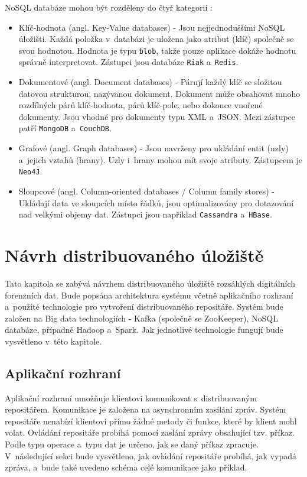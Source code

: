 \vspace{0.5cm}
\noindent NoSQL databáze mohou být rozděleny do čtyř kategorií \cite{noSqlOverview}:
\begin{itemize}
    \item Klíč-hodnota (angl. Key-Value databases) - Jsou nejjednoduššími NoSQL úložišti. Každá položka v~databázi je uložena jako atribut (klíč) společně se svou hodnotou. Hodnota je typu \texttt{blob}, takže pouze aplikace dokáže hodnotu správně interpretovat. Zástupci jsou databáze \texttt{Riak} a~\texttt{Redis}.
    
    \item Dokumentové (angl. Document databases) - Párují každý klíč se složitou datovou strukturou, nazývanou dokument. Dokument může obsahovat mnoho rozdílných párů klíč-hodnota, párů klíč-pole, nebo dokonce vnořené dokumenty. Jsou vhodné pro dokumenty typu XML a~JSON. Mezi zástupce patří \texttt{MongoDB} a~\texttt{CouchDB}.
    
    \item Grafové (angl. Graph databases) - Jsou navrženy pro ukládání entit (uzly) a~jejich vztahů (hrany). Uzly i~hrany mohou mít svoje atributy. Zástupcem je \texttt{Neo4J}.
    
    \item Sloupcové (angl. Column-oriented databases / Column family stores) - Ukládají data ve sloupcích místo řádků, jsou optimalizovány pro dotazování nad velkými objemy dat. Zástupci jsou například \texttt{Cassandra} a~\texttt{HBase}.
\end{itemize}

\chapter{Návrh distribuovaného úložiště} \label{distrRepDesignChapter}
Tato kapitola se zabývá návrhem distribuovaného úložiště rozsáhlých digitálních forenzních dat. Bude popsána architektura systému včetně aplikačního rozhraní a~použité technologie pro vytvoření distribuovaného repositáře.
Systém bude založen na Big data technologiích - Kafka (společně se ZooKeeper), NoSQL databáze, případně Hadoop a~Spark. Jak jednotlivé technologie fungují bude vysvětleno v~této kapitole.

\section{Aplikační rozhraní}
Aplikační rozhraní umožňuje klientovi komunikovat s~distribuovaným repositářem. Komunikace je založena na asynchronním zasílání zpráv. Systém repositáře nenabízí klientovi přímo žádné metody či funkce, které by klient mohl volat. Ovládání repositáře probíhá pomocí zaslání zprávy obsahující tzv. příkaz. Podle typu operace a~typu dat je určeno, jak se daný příkaz zpracuje. V~následující sekci bude vysvětleno, jak ovládání repositáře probíhá, jak vypadá zpráva, a~bude také uvedeno schéma celé komunikace jako příklad.

